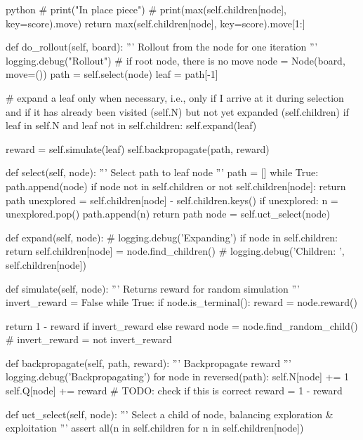 \begin{mintedbox}{python}
        # print("In place piece")
        # print(max(self.children[node], key=score).move)
        return max(self.children[node], key=score).move[1:]

    def do_rollout(self, board):
        '''
        Rollout from the node for one iteration
        '''
        logging.debug("Rollout")
        # if root node, there is no move
        node = Node(board, move=())
        path = self.select(node)
        leaf = path[-1]

        # expand a leaf only when necessary, i.e., only if I arrive at it during selection and if it has already been visited (self.N) but not yet expanded (self.children)
        if leaf in self.N and leaf not in self.children:
            self.expand(leaf)

        reward = self.simulate(leaf)
        self.backpropagate(path, reward)

    def select(self, node):
        '''
        Select path to leaf node
        '''
        path = []
        while True:
            path.append(node)
            if node not in self.children or not self.children[node]:
                return path
            unexplored = self.children[node] - self.children.keys()
            if unexplored:
                n = unexplored.pop()
                path.append(n)
                return path
            node = self.uct_select(node)

    def expand(self, node):
        # logging.debug('Expanding')
        if node in self.children:
            return
        self.children[node] = node.find_children()
        # logging.debug('Children: ', self.children[node])

    def simulate(self, node):
        '''
        Returns reward for random simulation
        '''
        invert_reward = False
        while True:
            if node.is_terminal():
                reward = node.reward()

                return 1 - reward if invert_reward else reward
            node = node.find_random_child()
            # invert_reward = not invert_reward

    def backpropagate(self, path, reward):
        '''
        Backpropagate reward
        '''
        logging.debug('Backpropagating')
        for node in reversed(path):
            self.N[node] += 1
            self.Q[node] += reward
            # TODO: check if this is correct
            reward = 1 - reward

    def uct_select(self, node):
        '''
        Select a child of node, balancing exploration & exploitation
        '''
        assert all(n in self.children for n in self.children[node])


\end{mintedbox}
